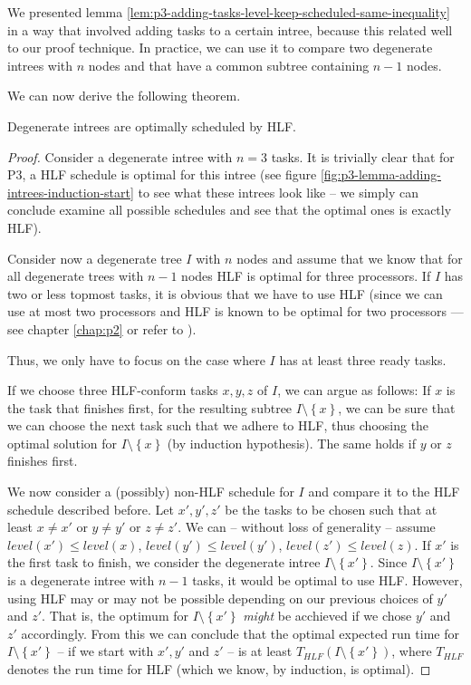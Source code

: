 We presented lemma \ref{lem:p3-adding-tasks-level-keep-scheduled-same-inequality} in a way that involved adding tasks to a certain intree, because this related well to our proof technique. In practice, we can use it to compare two degenerate intrees with $n$ nodes and that have a common subtree containing $n-1$ nodes.

We can now derive the following theorem.

\begin{theorem}
  Degenerate intrees are optimally scheduled by HLF.
\end{theorem}

\begin{proof}
  Consider a degenerate intree with $n=3$ tasks. It is trivially clear that for P3, a HLF schedule is optimal for this intree (see figure \ref{fig:p3-lemma-adding-intrees-induction-start} to see what these intrees look like -- we simply can conclude examine all possible schedules and see that the optimal ones is exactly HLF).
  
  Consider now a degenerate tree $I$ with $n$ nodes and assume that we know that for all degenerate trees with $n-1$ nodes HLF is optimal for three processors. If $I$ has two or less topmost tasks, it is obvious that we have to use HLF (since we can use at most two processors and HLF is known to be optimal for two processors --- see chapter \ref{chap:p2} or refer to \cite{chandyreynoldsshortpaper1975}).

  Thus, we only have to focus on the case where $I$ has at least three ready tasks.

  If we choose three HLF-conform tasks $x,y,z$ of $I$, we can argue as follows: If $x$ is the task that finishes first, for the resulting subtree $I\setminus \left\{ x \right\}$, we can be sure that we can choose the next task such that we adhere to HLF, thus choosing the optimal solution for $I\setminus\left\{ x \right\}$ (by induction hypothesis). The same holds if $y$ or $z$ finishes first.
  
  We now consider a (possibly) non-HLF schedule for $I$ and compare it to the HLF schedule described before.
  Let $x',y',z'$ be the tasks to be chosen such that at least $x\neq x'$ or $y\neq y'$ or $z\neq z'$. We can -- without loss of generality -- assume $level(x')\leq level(x)$, $level(y')\leq level(y')$, $level(z')\leq level(z)$. If $x'$ is the first task to finish, we consider the degenerate intree $I\setminus\left\{ x' \right\}$. Since $I \setminus \left\{ x' \right\}$ is a degenerate intree with $n-1$ tasks, it would be optimal to use HLF. However, using HLF may or may not be possible depending on our previous choices of $y'$ and $z'$. That is, the optimum for $I\setminus\left\{ x' \right\}$ \emph{might} be acchieved if we chose $y'$ and $z'$ accordingly. From this we can conclude that the optimal expected run time for $I\setminus\left\{ x' \right\}$ -- if we start with $x',y'$ and $z'$ -- is at least $T_{HLF}\left( I\setminus\left\{ x' \right\} \right)$, where $T_{HLF}$ denotes the run time for HLF (which we know, by induction, is optimal).


\end{proof}
